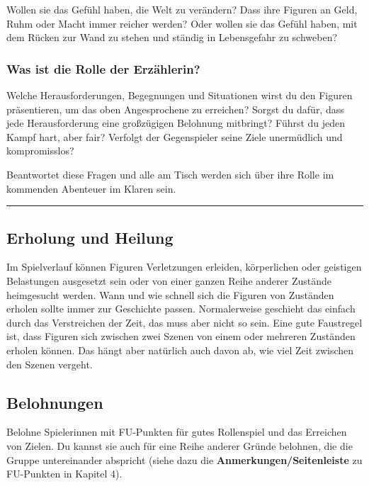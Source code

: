 \documentclass[]{article}
\begin{document}
Wollen sie das Gefühl haben, die Welt zu verändern? Dass ihre Figuren an
Geld, Ruhm oder Macht immer reicher werden? Oder wollen sie das Gefühl
haben, mit dem Rücken zur Wand zu stehen und ständig in Lebensgefahr zu
schweben?

\subsubsection{Was ist die Rolle der
Erzählerin?}\label{was-ist-die-rolle-der-erzuxe4hlerin}

Welche Herausforderungen, Begegnungen und Situationen wirst du den
Figuren präsentieren, um das oben Angesprochene zu erreichen? Sorgst du
dafür, dass jede Herausforderung eine großzügigen Belohnung mitbringt?
Führst du jeden Kampf hart, aber fair? Verfolgt der Gegenspieler seine
Ziele unermüdlich und kompromisslos?

Beantwortet diese Fragen und alle am Tisch werden sich über ihre Rolle
im kommenden Abenteuer im Klaren sein.

\begin{center}\rule{0.5\linewidth}{\linethickness}\end{center}

\subsection{Erholung und Heilung}\label{erholung-und-heilung}

Im Spielverlauf können Figuren Verletzungen erleiden, körperlichen oder
geistigen Belastungen ausgesetzt sein oder von einer ganzen Reihe
anderer Zustände heimgesucht werden. Wann und wie schnell sich die
Figuren von Zuständen erholen sollte immer zur Geschichte passen.
Normalerweise geschieht das einfach durch das Verstreichen der Zeit, das
muss aber nicht so sein. Eine gute Faustregel ist, dass Figuren sich
zwischen zwei Szenen von einem oder mehreren Zuständen erholen können.
Das hängt aber natürlich auch davon ab, wie viel Zeit zwischen den
Szenen vergeht.

\subsection{Belohnungen}\label{belohnungen}

Belohne Spielerinnen mit FU-Punkten für gutes Rollenspiel und das
Erreichen von Zielen. Du kannst sie auch für eine Reihe anderer Gründe
belohnen, die die Gruppe untereinander abspricht (siehe dazu die
\textbf{Anmerkungen/Seitenleiste} zu FU-Punkten in Kapitel 4).
\end{document}
